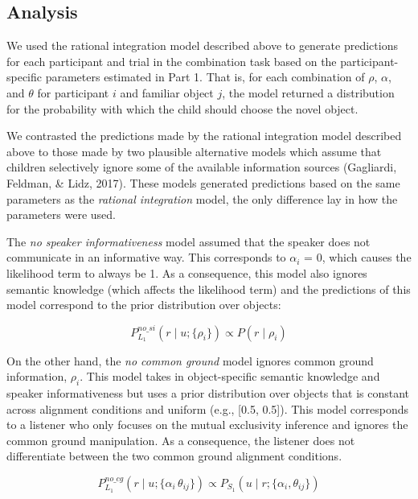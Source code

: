 \documentclass[
  man,floatsintext]{apa6}
\begin{document}
\hypertarget{analysis-1}{%
\subsection{Analysis}\label{analysis-1}}

We used the rational integration model described above to generate predictions for each participant and trial in the combination task based on the participant-specific parameters estimated in Part 1. That is, for each combination of \(\rho\), \(\alpha\), and \(\theta\) for participant \(i\) and familiar object \(j\), the model returned a distribution for the probability with which the child should choose the novel object.

We contrasted the predictions made by the rational integration model described above to those made by two plausible alternative models which assume that children selectively ignore some of the available information sources (Gagliardi, Feldman, \& Lidz, 2017). These models generated predictions based on the same parameters as the \emph{rational integration} model, the only difference lay in how the parameters were used.

The \emph{no speaker informativeness} model assumed that the speaker does not communicate in an informative way. This corresponds to \(\alpha_i\) = 0, which causes the likelihood term to always be 1. As a consequence, this model also ignores semantic knowledge (which affects the likelihood term) and the predictions of this model correspond to the prior distribution over objects:

\begin{equation}
P^{no\_si}_{L_1}(r \mid u; \{\rho_i\})\propto P(r \mid \rho_i) 
\label{eq:nome}
\end{equation}

On the other hand, the \emph{no common ground} model ignores common ground information, \(\rho_i\). This model takes in object-specific semantic knowledge and speaker informativeness but uses a prior distribution over objects that is constant across alignment conditions and uniform (e.g., {[}0.5, 0.5{]}). This model corresponds to a listener who only focuses on the mutual exclusivity inference and ignores the common ground manipulation. As a consequence, the listener does not differentiate between the two common ground alignment conditions.

\begin{equation}
P^{no\_cg}_{L_1}(r \mid u; \{\alpha_i\, \theta_{ij}\})\propto P_{S_1}(u \mid r; \{\alpha_i, \theta_{ij}\}) 
\label{eq:nocg}
\end{equation}
\end{document}
